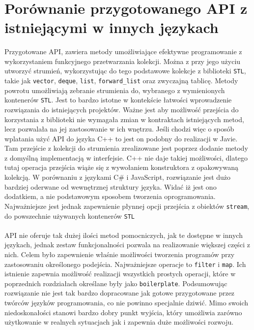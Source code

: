 \documentclass[a4paper,10pt]{report}
\begin{document}
\section{Porównanie przygotowanego API z istniejącymi w innych językach}
\paragraph{}
Przygotowane API, zawiera metody umożliwiające efektywne programowanie z wykorzystaniem funkcyjnego przetwarzania kolekcji. Można z przy jego użyciu utworzyć strumień, wykorzystując do tego podstawowe kolekcje z biblioteki \verb|STL|, takie jak \verb|vector|, \verb|deque|, \verb|list|, \verb|forward_list| oraz zwyczajną tablicę. Metody powrotu umożliwiają zebranie strumienia do, wybranego z wymienionych kontenerów \verb|STL|. Jest to bardzo istotne w kontekście łatwości wprowadzenie rozwiązania do istniejących projektów. Ważne jest aby możliwość przejścia do korzystania z biblioteki nie wymagała zmian w kontraktach istniejących metod, lecz pozwalała na jej zastosowanie w ich wnętrzu. Jeśli chodzi więc o sposób wplatania użyć API do języka C++ to jest on podobny do realizacji w Javie. Tam przejście z kolekcji do strumienia zrealizowane jest poprzez dodanie metody z domyślną implementacją w interfejsie. C++ nie daje takiej możliwości, dlatego tutaj operacja przejścia wiąże się z wywołaniem konstruktora z opakowywaną kolekcją. W porównaniu z językami C\# i JavaScript, rozwiązanie jest dużo bardziej oderwane od wewnętrznej struktury języka. Widać iż jest ono dodatkiem, a nie podstawowym sposobem tworzenia oprogramowania. Najważniejsze jest jednak zapewnienie płynnej opcji przejścia z obiektów \verb|stream|, do powszechnie używanych kontenerów \verb|STL|
\paragraph{} API nie oferuje tak dużej ilości metod pomocniczych, jak te dostępne w innych językach, jednak zestaw funkcjonalności pozwala na realizowanie większej części z nich. Celem było zapewnienie właśnie możliwości tworzenia programów przy zastosowaniu określonego podejścia. Najważniejsze operacje to \verb|filter| i \verb|map|. Ich istnienie zapewnia możliwość realizacji wszystkich prostych operacji, które w poprzednich rozdziałach określane były jako \verb|boilerplate|. Podsumowując rozwiązanie nie jest tak bardzo dopracowane jak gotowe przygotowane przez twórców języków programowania, co nie powinno specjalnie dziwić. Mimo swoich niedoskonałości stanowi bardzo dobry punkt wyjścia, który umożliwia zarówno użytkowanie w realnych sytuacjach jak i zapewnia duże możliwości rozwoju.
\end{document}
